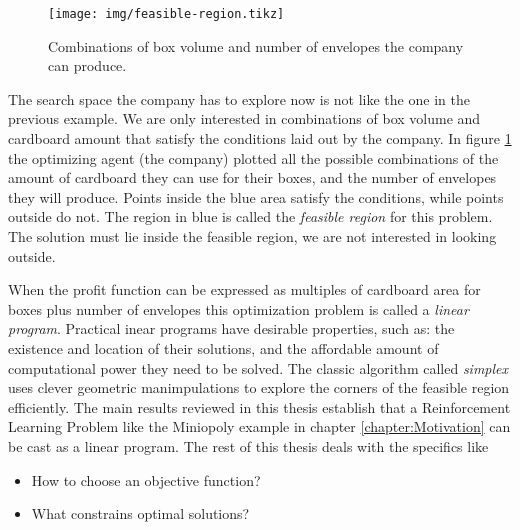 \begin{figure}
   \centering
   \texttt{[image: img/feasible-region.tikz]} 
   \caption{Combinations of box volume and number of envelopes the company can produce.}
   \label{fig:feasible-region}
\end{figure}

The search space the company has to explore now is not like the one in the
previous example. We are only interested in combinations of box volume and
cardboard amount that satisfy the conditions laid out by the company. In figure
\ref{fig:feasible-region} the optimizing agent (the company) plotted all the
possible combinations of the amount of cardboard they can use for their boxes,
and the number of envelopes they will produce. Points inside the blue area
satisfy the conditions, while points outside do not. The region in blue is
called the \emph{feasible region} for this problem. The solution must lie inside
the feasible region, we are not interested in looking outside.

When the profit function can be expressed as multiples of cardboard area for
boxes plus number of envelopes this optimization problem is called a
\emph{linear program}. Practical inear programs have desirable properties, such
as: the existence and location of their solutions, and the affordable amount of
computational power they need to be solved. The classic algorithm called
\emph{simplex} uses clever geometric manimpulations to explore the corners of
the feasible region efficiently. The main results reviewed in this thesis
establish that a Reinforcement Learning Problem like the Miniopoly example in
chapter \ref{chapter:Motivation} can be cast as a linear program. The rest of
this thesis deals with the specifics like
\begin{itemize}
    \item How to choose an objective function? 
    \item What constrains optimal solutions?
\end{itemize}
